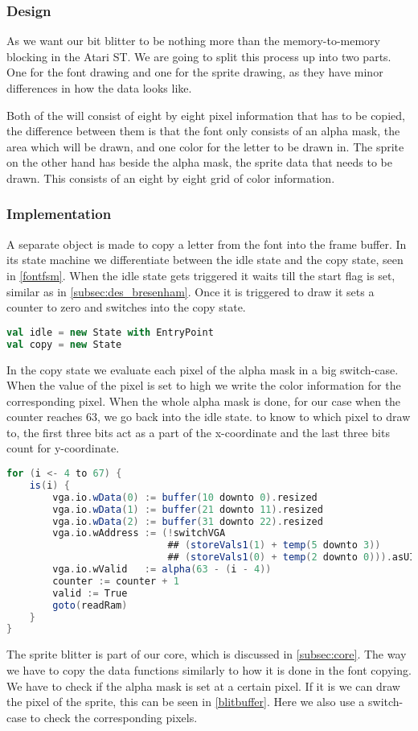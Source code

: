 \subsubsection*{Design}
As we want our bit blitter to be nothing more than the memory-to-memory blocking in the Atari ST. We are going to split this process up into two parts. One for the font drawing and one for the sprite drawing, as they have minor differences in how the data looks like.

Both of the will consist of eight by eight pixel information that has to be copied, the difference between them is that the font only consists of an alpha mask, the area which will be drawn, and one color for the letter to be drawn in. The sprite on the other hand has beside the alpha mask, the sprite data that needs to be drawn. This consists of an eight by eight grid of color information. 

\subsubsection*{Implementation}
A separate object is made to copy a letter from the font into the frame buffer. In its state machine we differentiate between the idle state and the copy state, seen in \cref{fontfsm}. When the idle state gets triggered it waits till the start flag is set, similar as in \cref{subsec:des_bresenham}. Once it is triggered to draw it sets a counter to zero and switches into the copy state.
\begin{lstlisting}[language=scala, caption={States of the Font Blitter}, label=fontfsm]
val idle = new State with EntryPoint
val copy = new State
\end{lstlisting}
In the copy state we evaluate each pixel of the alpha mask in a big switch-case. When the value of the pixel is set to high we write the color information for the corresponding pixel. When the whole alpha mask is done, for our case when the counter reaches 63, we go back into the idle state.
to know to which pixel to draw to, the first three bits act as a part of the x-coordinate and the last three bits count for y-coordinate.
\begin{lstlisting}[language=scala, caption={Copying the sprite color information into the frame buffer}, label={blitbuffer}]
for (i <- 4 to 67) {
	is(i) {
		vga.io.wData(0) := buffer(10 downto 0).resized
		vga.io.wData(1) := buffer(21 downto 11).resized
		vga.io.wData(2) := buffer(31 downto 22).resized
		vga.io.wAddress := (!switchVGA 
				  			## (storeVals1(1) + temp(5 downto 3)) 
				  			## (storeVals1(0) + temp(2 downto 0))).asUInt
		vga.io.wValid   := alpha(63 - (i - 4))
		counter := counter + 1
		valid := True
		goto(readRam)
	}
}
\end{lstlisting}
The sprite blitter is part of our core, which is discussed in \cref{subsec:core}. The way we have to copy the data functions similarly to how it is done in the font copying. We have to check if the alpha mask is set at a certain pixel. If it is we can draw the pixel of the sprite, this can be seen in \cref{blitbuffer}. Here we also use a switch-case to check the corresponding pixels.
